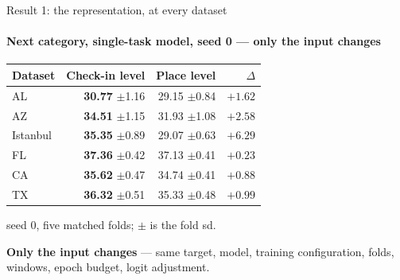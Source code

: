 \documentclass{beamer}
\begin{document}
\begin{frame}{Result 1: the representation, at every dataset}
    \framesubtitle{Next category, single-task model, seed 0 --- only the input changes}

    \begin{center}
        \small
        \setlength{\tabcolsep}{9pt}
        \renewcommand{\arraystretch}{1.0}
        \begin{tabular}{@{}lrrr@{}}
            \toprule
            \textbf{Dataset} & \textbf{Check-in level} & \textbf{Place level} & \textbf{$\Delta$} \\
            \midrule
            AL       & \textbf{30.77} $\pm$1.16 & 29.15 $\pm$0.84 & $+1.62$ \\
            AZ       & \textbf{34.51} $\pm$1.15 & 31.93 $\pm$1.08 & $+2.58$ \\
            Istanbul & \textbf{35.35} $\pm$0.89 & 29.07 $\pm$0.63 & $+6.29$ \\
            FL       & \textbf{37.36} $\pm$0.42 & 37.13 $\pm$0.41 & $+0.23$ \\
            CA       & \textbf{35.62} $\pm$0.47 & 34.74 $\pm$0.41 & $+0.88$ \\
            TX       & \textbf{36.32} $\pm$0.51 & 35.33 $\pm$0.48 & $+0.99$ \\
            \bottomrule
        \end{tabular}\par
        \smallskip
        {\footnotesize seed 0, five matched folds; $\pm$ is the fold sd.\par}
    \end{center}

    \medskip
    {\footnotesize
    \textbf{Only the input changes} --- same target, model, training configuration, folds,
    windows, epoch budget, logit adjustment.\par}
\end{frame}
\end{document}
